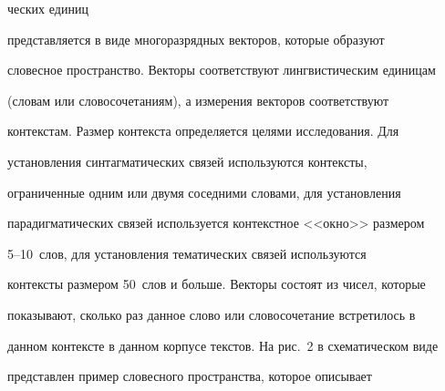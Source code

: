 







\noindent


ческих единиц


представляется в виде многоразрядных векторов, которые образуют


словесное пространство. Векторы соответст\-вуют лингвистическим единицам


(словам или словосочетаниям), а измерения векторов соответствуют


контекстам. Размер контекста определяется целями исследования. Для


установления син\-та\-гматических связей используются контексты,


ограниченные одним или двумя соседними словами, для установления


парадигматических связей используется контекстное <<окно>> размером


     5--10~слов, для установления тематических связей используются


контексты размером 50~слов и больше. Векторы состоят из чисел, которые


показывают, сколько раз данное слово или словосочетание встретилось в


данном контексте в данном корпусе текстов. На рис.~2 в схематическом виде


представлен пример словесного пространства, которое описывает


